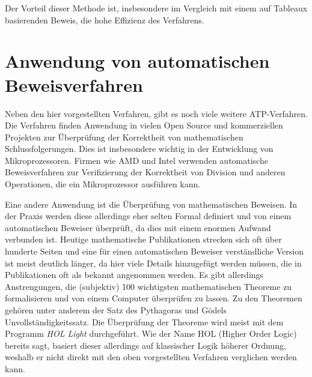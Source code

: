 Der Vorteil dieser Methode ist, insbesondere im Vergleich mit einem auf Tableaux basierenden Beweis, die hohe Effizienz des Verfahrens.

\section{Anwendung von automatischen Beweisverfahren}
Neben den hier vorgestellten Verfahren, gibt es noch viele weitere \ac{ATP}-Verfahren. Die Verfahren finden Anwendung in vielen Open Source und kommerziellen Projekten zur Überprüfung der Korrektheit von mathematischen Schlussfolgerungen. Dies ist insbesondere wichtig in der Entwicklung von Mikroprozessoren. Firmen wie AMD und Intel verwenden automatische Beweisverfahren zur Verifizierung der Korrektheit von Division und anderen Operationen, die ein Mikroprozessor ausführen kann.

Eine andere Anwendung ist die Überprüfung von mathematischen Beweisen. In der Praxis werden diese allerdings eher selten Formal definiert und von einem automatischen Beweiser überprüft, da dies mit einem enormen Aufwand verbunden ist. Heutige mathematische Publikationen strecken sich oft über hunderte Seiten und eine für einen automatischen Beweiser verständliche Version ist meist deutlich länger, da hier viele Details hinzugefügt werden müssen, die in Publikationen oft als bekannt angenommen werden. Es gibt allerdings Anstrengungen, die (subjektiv) 100 wichtigsten mathematischen Theoreme zu formalisieren und von einem Computer überprüfen zu lassen. \cite{formalize_100_theorems} Zu den Theoremen gehören unter anderem der Satz des Pythagoras und Gödels Unvollständigkeitssatz. Die Überprüfung der Theoreme wird meist mit dem Programm \textit{HOL Light} durchgeführt. Wie der Name HOL (Higher Order Logic) bereits sagt, basiert dieser allerdings auf klassischer Logik höherer Ordnung, weshalb er nicht direkt mit den oben vorgestellten Verfahren verglichen werden kann.
